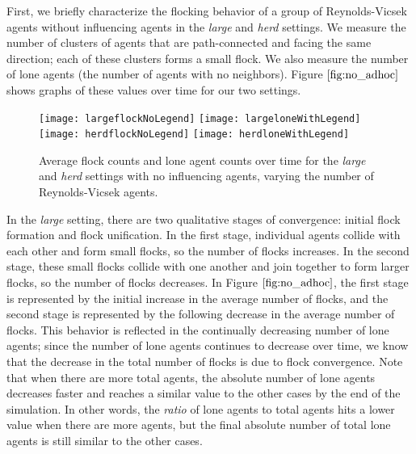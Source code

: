 First, we briefly characterize the flocking behavior of a group of Reynolds-Vicsek
agents without influencing agents in the \textit{large} and \textit{herd} settings.
We measure the number of clusters of agents that are path-connected and facing the
same direction; each of these clusters forms a small flock.
We also measure the number of lone agents (the number of agents with no neighbors).
Figure $\ref{fig:no_adhoc}$ shows graphs of these values over time for our two
settings.
\begin{figure}
    \centering
    \texttt{[image: largeflockNoLegend]}
    \texttt{[image: largeloneWithLegend]}
    \texttt{[image: herdflockNoLegend]}
    \texttt{[image: herdloneWithLegend]}
    \caption{Average flock counts and lone agent counts over time for the
    \textit{large} and \textit{herd} settings with no influencing agents,
    varying the number of Reynolds-Vicsek agents.}
    \label{fig:no_adhoc}
\end{figure}

In the \textit{large} setting, there are two qualitative stages of convergence:
initial flock formation and flock unification.
In the first stage, individual agents collide with each other and form small
flocks, so the number of flocks increases.
In the second stage, these small flocks collide with one another and join
together to form larger flocks, so the number of flocks decreases.
In Figure $\ref{fig:no_adhoc}$, the first stage is represented by the initial
increase in the average number of flocks, and the second stage is represented
by the following decrease in the average number of flocks.
This behavior is reflected in the continually decreasing number of lone agents;
since the number of lone agents continues to decrease over time, we know that the
decrease in the total number of flocks is due to flock convergence.
Note that when there are more total agents, the absolute number of lone agents
decreases faster and reaches a similar value to the other cases by the end of the
simulation.
In other words, the \textit{ratio} of lone agents to total agents hits a
lower value when there are more agents, but the final absolute number of total
lone agents is still similar to the other cases.

